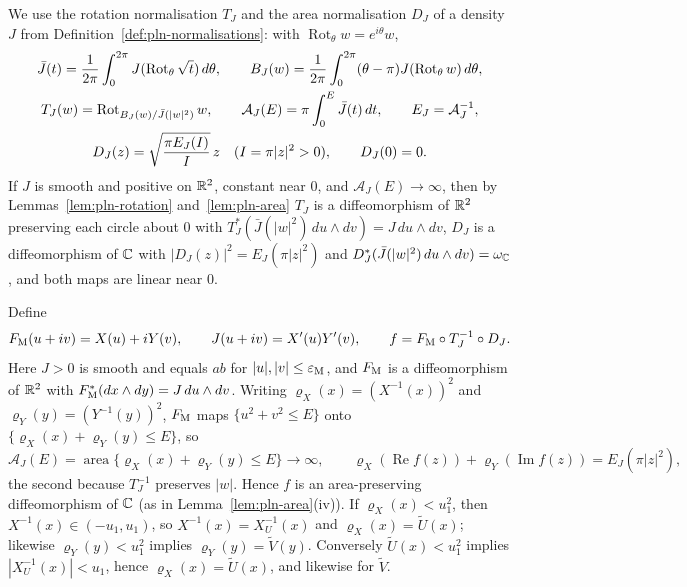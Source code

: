 We use the rotation normalisation $T_J$ and the area normalisation $D_J$ of a density $J$ from
Definition~\ref{def:pln-normalisations}: with $\operatorname{Rot}_\theta w=e^{i\theta}w$,
\begin{gather}\label{eq:scalar-inner-normalisation}
 \bar J(t)=\frac1{2\pi}\int_0^{2\pi}J(\operatorname{Rot}_\theta\sqrt t)\,d\theta,\qquad
 B_J(w)=\frac1{2\pi}\int_0^{2\pi}(\theta-\pi)J(\operatorname{Rot}_\theta w)\,d\theta,\\
 T_J(w)=\operatorname{Rot}_{B_J(w)/\bar J(|w|^2)}w,\qquad
 \mathcal A_J(E)=\pi\int_0^E\bar J(t)\,dt,\qquad E_J=\mathcal A_J^{-1},\notag\\
 D_J(z)=\sqrt{\frac{\pi E_J(I)}{I}}\,z\quad(I=\pi|z|^2>0),\qquad D_J(0)=0.\notag
\end{gather}
If $J$ is smooth and positive on $\mathbb{R}^2$, constant near $0$, and $\mathcal A_J(E)\to\infty$, then by
Lemmas~\ref{lem:pln-rotation} and~\ref{lem:pln-area} $T_J$ is a diffeomorphism of $\mathbb{R}^2$ preserving each circle about
$0$ with $T_J^*(\bar J(|w|^2)\,du\wedge dv)=J\,du\wedge dv$, $D_J$ is a diffeomorphism of $\mathbb{C}$ with
$|D_J(z)|^2=E_J(\pi|z|^2)$ and $D_J^*(\bar J(|w|^2)\,du\wedge dv)=\omega_{\mathbb{C}}$, and both maps are linear near $0$.

Define
\begin{equation}\label{eq:scalar-inner-map}
 F_{\rm M}(u+iv)=X(u)+iY(v),\qquad J(u+iv)=X'(u)Y'(v),\qquad
 f=F_{\rm M}\circ T_J^{-1}\circ D_J.
\end{equation}
Here $J>0$ is smooth and equals $ab$ for $|u|,|v|\le\varepsilon_{\rm M}$, and $F_{\rm M}$ is a diffeomorphism of $\mathbb{R}^2$ with
$F_{\rm M}^*(dx\wedge dy)=J\,du\wedge dv$. Writing $\varrho_X(x)=(X^{-1}(x))^2$ and $\varrho_Y(y)=(Y^{-1}(y))^2$,
$F_{\rm M}$ maps $\{u^2+v^2\le E\}$ onto $\{\varrho_X(x)+\varrho_Y(y)\le E\}$, so
\begin{equation}\label{eq:scalar-level-area}
 \mathcal A_J(E)=\operatorname{area}\{\varrho_X(x)+\varrho_Y(y)\le E\}\longrightarrow\infty,\qquad
 \varrho_X(\operatorname{Re}f(z))+\varrho_Y(\operatorname{Im}f(z))=E_J(\pi|z|^2),
\end{equation}
the second because $T_J^{-1}$ preserves $|w|$. Hence $f$ is an area-preserving diffeomorphism of $\mathbb{C}$ (as in
Lemma~\ref{lem:pln-area}(iv)). If $\varrho_X(x)<u_1^2$, then $X^{-1}(x)\in(-u_1,u_1)$, so $X^{-1}(x)=X_U^{-1}(x)$ and
$\varrho_X(x)=\widetilde U(x)$; likewise $\varrho_Y(y)<u_1^2$ implies $\varrho_Y(y)=\widetilde V(y)$. Conversely
$\widetilde U(x)<u_1^2$ implies $|X_U^{-1}(x)|<u_1$, hence $\varrho_X(x)=\widetilde U(x)$, and likewise for $\widetilde V$.

